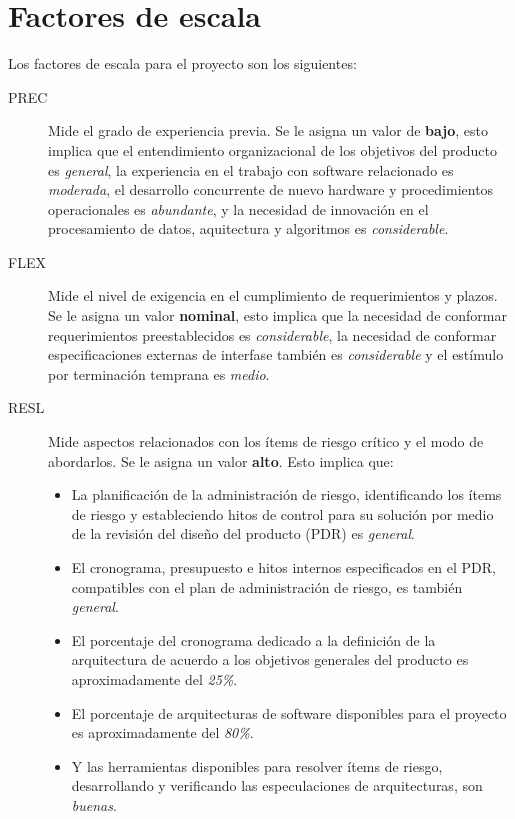 \documentclass[11pt,a4paper,spanish,twoside]{book}
\begin{document}
\section{Factores de escala}
Los factores de escala para el proyecto son los siguientes:
\begin{description}
\item[PREC] Mide el grado de experiencia previa. Se le asigna un valor de
\textbf{bajo}, esto implica que el entendimiento organizacional de los
objetivos del producto es \emph{general}, la experiencia en el trabajo con 
software relacionado es \emph{moderada}, el desarrollo concurrente de nuevo
hardware y procedimientos operacionales es \emph{abundante}, y la necesidad
de innovación en el procesamiento de datos, aquitectura y algoritmos es
\emph{considerable}.

\item[FLEX] Mide el nivel de exigencia en el cumplimiento de requerimientos
y plazos. Se le asigna un valor \textbf{nominal}, esto implica que la
necesidad de conformar requerimientos preestablecidos es \emph{considerable},
la necesidad de conformar especificaciones externas de interfase también es
\emph{considerable} y el estímulo por terminación temprana es \emph{medio}.

\item[RESL] Mide aspectos relacionados con los ítems de riesgo crítico y el
modo de abordarlos. Se le asigna un valor \textbf{alto}. Esto implica que:
\begin{itemize}
\item La planificación de la administración de riesgo, identificando los
ítems de riesgo y estableciendo hitos de control para su solución por medio
de la revisión del diseño del producto (PDR) es \emph{general}.
\item El cronograma, presupuesto e hitos internos especificados en el PDR,
compatibles con el plan de administración de riesgo, es también \emph{general}.
\item El porcentaje del cronograma dedicado a la definición de la arquitectura
de acuerdo a los objetivos generales del producto es aproximadamente del
\emph{25\%}.
\item El porcentaje de arquitecturas de software disponibles para el proyecto
es aproximadamente del \emph{80\%}.
\item Y las herramientas disponibles para resolver ítems de riesgo,
desarrollando y verificando las especulaciones de arquitecturas, son
\emph{buenas}.
\end{itemize}


\end{description}
\end{document}
